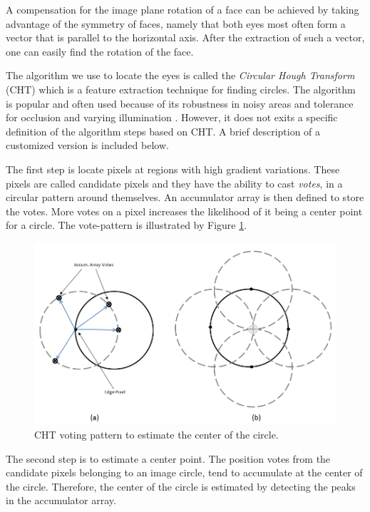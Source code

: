 A compensation for the image plane rotation of a face can be achieved by taking advantage of the symmetry of faces, namely that both eyes most often form a vector that is parallel to the horizontal axis. After the extraction of such a vector, one can easily find the rotation of the face.

The algorithm we use to locate the eyes is called the \textit{Circular Hough Transform} (CHT) which is a feature extraction technique for finding circles. The algorithm is popular and often used because of its robustness in noisy areas and tolerance for occlusion and varying illumination \cite{cht}. However, it does not exits a specific definition of the algorithm steps based on CHT. A brief description of a customized version is included below.



The first step is locate pixels at regions with high gradient variations. These pixels are called candidate pixels and they have the ability to cast \textit{votes}, in a circular pattern around themselves. An accumulator array is then defined to store the votes. More votes on a pixel increases the likelihood of it being a center point for a circle. The vote-pattern is illustrated by Figure \ref{fig:CHT}.

\begin{figure}[H]
\includegraphics[scale=0.4]{img/fd/accarray.png}
\caption{CHT voting pattern to estimate the center of the circle.}
\label{fig:CHT}
\end{figure}

The second step is to estimate a center point. The position votes from the candidate pixels belonging to an image circle, tend to accumulate at the center of the circle. Therefore, the center of the circle is estimated by detecting the peaks in the accumulator array.


